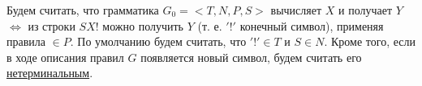 


    \newpage
    Будем считать, что грамматика $G_0 = <T, N, P, S>$ вычисляет $X$ и получает $Y$ $\iff$ из строки $SX!$ можно получить $Y$ (т. е. $'!'$ конечный символ), применяя правила $\in P$. По умолчанию будем считать, что $'!' \in T$ и $S \in N$. Кроме того, если в ходе описания правил $G$ появляется новый символ, будем считать его \underline{нетерминальным}.
    
    
    
    


